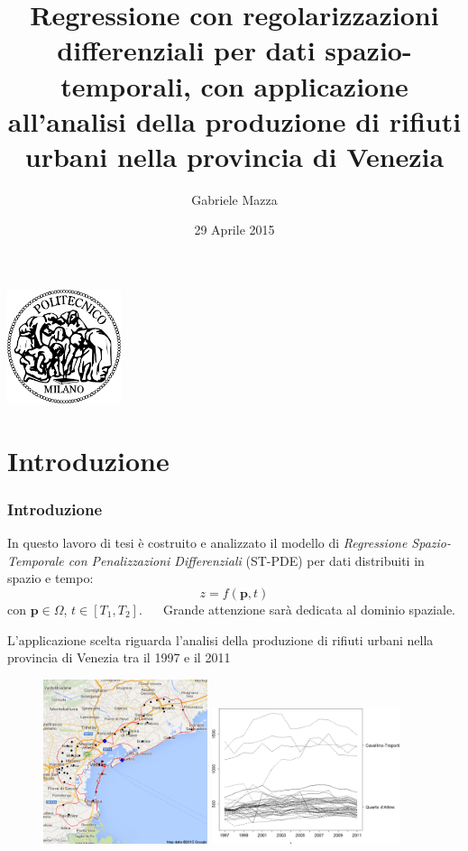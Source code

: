 \documentclass[landscape,9pt]{beamer}                           %
\date{29 Aprile 2015}
\author{Gabriele Mazza}
\title{Regressione con regolarizzazioni differenziali per dati spazio-temporali, con applicazione all'analisi della produzione di rifiuti urbani nella provincia di Venezia}
\begin{document}
\begin{frame}
\maketitle
\begin{center}
\includegraphics[width=0.25\textwidth,
	height=0.28\textheight]
	{Immagini/Logo.png}
\end{center}
\end{frame}

\section{Introduzione}
\begin{frame}
\frametitle{Introduzione}
In questo lavoro di tesi è costruito e analizzato il modello di \textit{Regressione Spazio-Temporale con Penalizzazioni Differenziali} (ST-PDE) per dati distribuiti in spazio e tempo:
$$
z=f(\bm{p},t)
$$
con $\bm{p} \in \Omega$, $t \in [T_1,T_2]$.
\ \ 
\newline
\newline
Grande attenzione sarà dedicata al dominio spaziale.
\end{frame}

\begin{frame}
L'applicazione scelta riguarda l'analisi della produzione di rifiuti urbani nella provincia di Venezia tra il 1997 e il 2011
\begin{figure}[h]
	\centering
	\subfigure
   {
	\includegraphics[width=0.43\textwidth]{Immagini/CTQDA.png}   
   }
	\subfigure
   {
	\includegraphics[width=0.49\textwidth]{Immagini/andamenti_temporali.png}
   }
\end{figure}
\end{frame}
\end{document}
